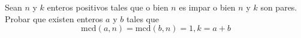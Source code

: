 Sean $n$ y $k$ enteros positivos tales que o bien $n$ es impar o bien $n$ y $k$ son pares. Probar que existen enteros $a$ y $b$ tales que
\[ \mathrm{mcd}(a,n) = \mathrm{mcd}(b,n) = 1, k=a+b \]

